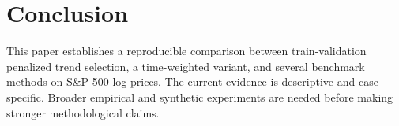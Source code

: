 \section{Conclusion}
This paper establishes a reproducible comparison between train-validation
penalized trend selection, a time-weighted variant, and several benchmark
methods on S\&P 500 log prices. The current evidence is descriptive and
case-specific. Broader empirical and synthetic experiments are needed before
making stronger methodological claims.
